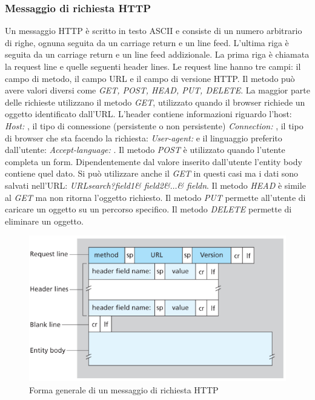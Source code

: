 \subsubsection{Messaggio di richiesta HTTP}
Un messaggio HTTP \`e scritto in testo ASCII e consiste di un numero arbitrario di righe, ognuna seguita da un carriage return e un line feed. L'ultima riga \`e seguita da un carriage return e un line feed 
addizionale. La prima riga \`e chiamata la request line e quelle seguenti header lines. Le request line hanno tre campi: il campo di metodo, il campo URL e il campo di versione HTTP. Il metodo pu\`o avere
valori diversi come \emph{GET, POST, HEAD, PUT, DELETE}. La maggior parte delle richieste utilizzano il metodo \emph{GET}, utilizzato quando il browser richiede un oggetto identificato dall'URL. L'header
contiene informazioni riguardo l'host: \emph{Host: }, il tipo di connessione (persistente o non persistente) \emph{Connection: }, il tipo di browser che sta facendo la richiesta: \emph{User-agent: } e il linguaggio
preferito dall'utente: \emph{Accept-language: }. Il metodo \emph{POST} \`e utilizzato quando l'utente completa un form. Dipendentemente dal valore inserito dall'utente l'entity body contiene quel dato. Si 
pu\`o utilizzare anche il \emph{GET} in questi casi ma i dati sono salvati nell'URL: \emph{URLsearch?field1\& field2\&$\dots$\& fieldn}. Il metodo \emph{HEAD} \`e simile al \emph{GET} ma non ritorna 
l'oggetto richiesto. Il metodo \emph{PUT} permette all'utente di caricare un oggetto su un percorso specifico. Il metodo \emph{DELETE} permette di eliminare un oggetto.
\begin{figure}
\includegraphics[width=\textwidth]{HTTPRequestMessage.png}
\caption{Forma generale di un messaggio di richiesta HTTP}
\end{figure}
